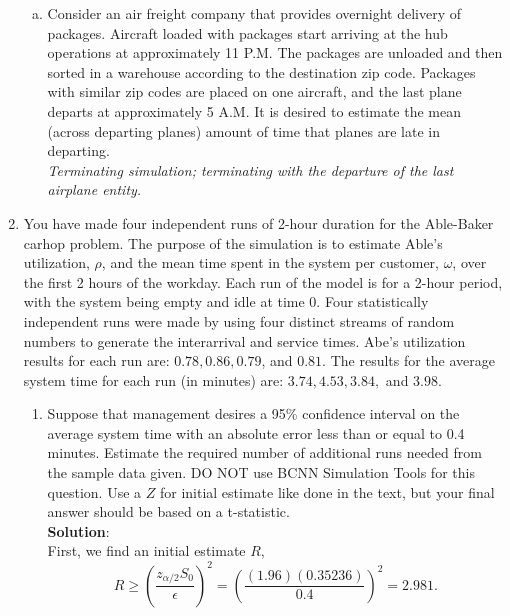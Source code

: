 \documentclass[12pt]{amsart}
\begin{document}
\begin{enumerate}[1.]
\begin{enumerate}[a.]
	\item Consider an air freight company that provides overnight delivery of packages. Aircraft
	loaded with packages start arriving at the hub operations at approximately 11 P.M. The
	packages are unloaded and then sorted in a warehouse according to the destination zip code.
	Packages with similar zip codes are placed on one aircraft, and the last plane departs at
	approximately 5 A.M. It is desired to estimate the mean (across departing planes) amount
	of time that planes are late in departing. \\
	
	\textit{Terminating simulation; terminating with the departure of the last
		airplane entity.}\\
	
\end{enumerate}
\clearpage

\item You have made four independent runs of 2-hour duration for the Able-Baker carhop problem.
The purpose of the simulation is to estimate Able’s utilization, \(\rho\), and the mean time spent in
the system per customer, \(\omega\), over the first 2 hours of the workday. Each run of the model is for
a 2-hour period, with the system being empty and idle at time 0. Four statistically independent
runs were made by using four distinct streams of random numbers to generate the interarrival
and service times. Abe’s utilization results for each run are: \(0.78, 0.86, 0.79\), and \(0.81\). The
results for the average system time for each run (in minutes) are: \(3.74, 4.53, 3.84,\) and \(3.98\). \\

\begin{enumerate}
	\item Suppose that management desires a 95\% confidence interval on the average system time
	with an absolute error less than or equal to 0.4 minutes. Estimate the required number of
	additional runs needed from the sample data given. DO NOT use BCNN Simulation Tools
	for this question. Use a \(Z\) for initial estimate like done in the text, but your final answer
	should be based on a t-statistic. \\
	
	\textbf{Solution}:\\
	
	First, we find an initial estimate $R$,
	\[R \geq \left(\frac{z_{\alpha/2}S_0}{\epsilon}\right)^2 = \left(\frac{(1.96)(0.35236)}{0.4}\right)^2 = 2.981. \]
	

\end{enumerate}
\end{enumerate}
\end{document}
